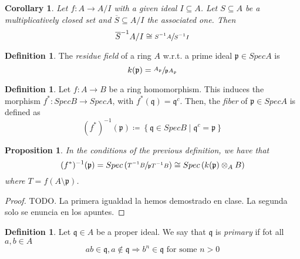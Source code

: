 \documentclass[11pt]{article}
\newtheorem{corollary}{Corollary}[theorem]
\newtheorem{prop}[theorem]{Proposition}
\theoremstyle{definition}
\newtheorem{defn}[theorem]{Definition}
\begin{document}
        \begin{corollary}
            Let $f:A \longrightarrow A/I$ with a given ideal $I \subseteq A$.
            Let $S \subseteq A$ be a multiplicatively closed set and $\overline{S} \subseteq A/I$ the associated one.
            Then
            \[
                \overline{S}^{-1}A/I \cong \sfrac{S^{-1}A}{S^{-1}I}  %
            \]
        \end{corollary}

        \begin{defn}
            The \emph{residue field} of a ring $A$ w.r.t. a prime ideal $\mathfrak{p} \in SpecA$ is
            \[
                k(\mathfrak{p}) = \sfrac{A_{\mathfrak{p}}}{\mathfrak{p}A_{\mathfrak{p}}}
            \]
        \end{defn}

        \begin{defn}
            Let $f: A \longrightarrow B$ be a ring homomorphism.
            This induces the morphism $f^*: SpecB \longrightarrow Spec A$, with $f^*(\mathfrak{q}) = \mathfrak{q}^c$.
            Then, the \emph{fiber} of $\mathfrak{p} \in SpecA$ is defined as
            \[
                (f^*)^{-1}(\mathfrak{p}) \coloneqq \left\{ \mathfrak{q} \in SpecB \mid \mathfrak{q}^c = \mathfrak{p} \right\}
            \]
        \end{defn}

        \begin{prop}
            In the conditions of the previous definition, we have that
            \[
                (f^*)^{-1}(\mathfrak{p}) = Spec \left( \sfrac{T^{-1}B}{\mathfrak{p}T^{-1}B} \right) \cong Spec\left( k(\mathfrak{p}) \otimes_A B \right)
            \]
            where $T = f(A \setminus \mathfrak{p})$.
        \end{prop}
            \begin{proof}

                TODO. La primera igualdad la hemos demostrado en clase.
                La segunda solo se enuncia en los apuntes.

            \end{proof}

        \begin{defn}
            Let $\mathfrak{q} \in A$ be a proper ideal.
            We say that $\mathfrak{q}$ is \emph{primary} if fot all $a, b \in A$
            \[
                ab \in \mathfrak{q}, a \notin \mathfrak{q} \Longrightarrow b^n \in \mathfrak{q} \text{ for some } n > 0
            \]
        \end{defn}
\end{document}
